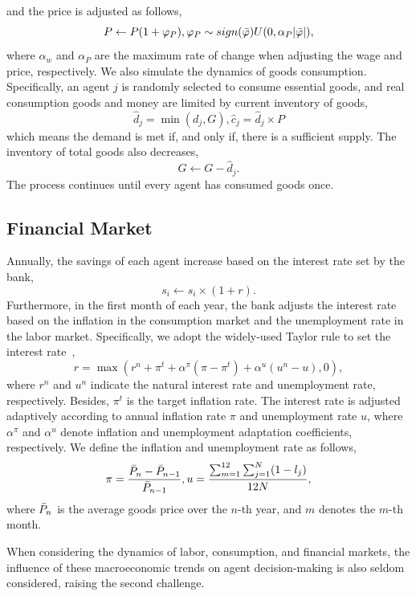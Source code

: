 and the price is adjusted as follows,
\begin{equation}
    P \leftarrow P (1 + \varphi_P), \varphi_P \sim sign(\Bar{\varphi})U(0, \alpha_P\vert\Bar{\varphi}\vert),
\end{equation}
where $\alpha_w$ and $\alpha_P$ are the maximum rate of change when adjusting the wage and price, respectively.
We also simulate the dynamics of goods consumption. Specifically, an agent $j$ is randomly selected to consume essential goods, and real consumption goods and money are limited by current inventory of goods,
\begin{equation}
    \hat{d}_j = \min(d_j, G), \hat{c}_j = \hat{d}_j\times P
\end{equation}
which means the demand is met if, and only if, there is a sufficient supply. The inventory of total goods also decreases,
\begin{equation}
    G \leftarrow G - \hat{d}_j.
\end{equation}
The process continues until every agent has consumed goods once.



\subsection{Financial Market}
Annually, the savings of each agent increase based on the interest rate set by the bank,
\begin{equation}
    s_i \leftarrow s_i\times (1 + r).
\end{equation}
Furthermore, in the first month of each year, the bank adjusts the interest rate based on the inflation in the consumption market and the unemployment rate in the labor market. Specifically, we adopt the widely-used Taylor rule to set the interest rate~\cite{wolf2013multi,dawid2018agent},
\begin{equation}
    r = \max(r^n + \pi^t + \alpha^\pi(\pi - \pi^t) + \alpha^u(u^n - u), 0),
\end{equation}
where $r^n$ and $u^n$ indicate the natural interest rate and unemployment rate, respectively. Besides, $\pi^t$ is the target inflation rate. The interest rate is adjusted adaptively according to annual inflation rate $\pi$ and unemployment rate $u$, where $\alpha^\pi$ and $\alpha^u$ denote inflation and unemployment adaptation coefficients, respectively. We define the inflation and unemployment rate as follows,
\begin{equation}
\label{def-indicator}
    \pi = \frac{\Bar{P}_n - \Bar{P}_{n-1}}{\Bar{P}_{n-1}}, u = \frac{\sum_{m=1}^{12}\sum_{j=1}^N (1-l_j)}{12 N},
\end{equation}
where $\Bar{P}_n$ is the average goods price over the $n$-th year, and $m$ denotes the $m$-th month.

When considering the dynamics of labor, consumption, and financial markets, the influence of these macroeconomic trends on agent decision-making is also seldom considered, raising the second challenge. 










